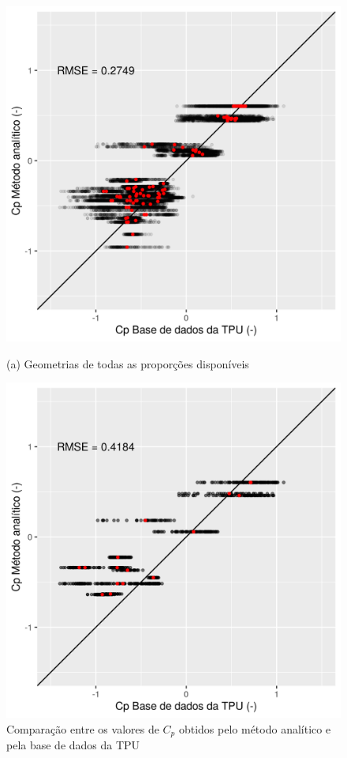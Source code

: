 \documentclass[brazil,hardcopy,openany]{ufscthesis} %
\begin{document}
\begin{figure}[h]
	\caption{Comparação entre os valores de $C_p$ obtidos pelo método analítico e pela base de dados da TPU}
	\begin{minipage}{.5\textwidth}
		\includegraphics[width=\linewidth]{img/cp_diff_scatter_all.png}
	\begin{center}
		\small{(a) Geometrias de todas as proporções disponíveis}
	\end{center}
	\end{minipage}%
	\begin{minipage}{.5\textwidth}
		\includegraphics[width=\linewidth]{img/cp_diff_scatter.png}

\end{minipage}
\end{figure}
\end{document}
